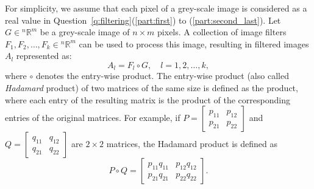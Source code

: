\documentclass[10pt,addpoints]{exam} %
\newcommand{\matrixTwo}[4]{\left[\begin{array}{cc}#1&#2\\#3&#4\end{array}\right]}
\newcommand{\nRm}{{}^{n}\mathbb{R}^{m}}
\newcommand{\makenonemptybox}[2]{%
\par\nobreak\vspace{\ht\strutbox}\noindent
\setlength{\fboxrule}{0pt} %
\fbox{%
\parbox[c][#1][t]{\dimexpr\linewidth-2\fboxsep}{
  \hrule width \hsize height 0pt
  \vspace{-0.6cm}
  \color{SolutionColor}#2\color{black}
 }%
}%
}
\begin{document}
\begin{questions}
  \question\label{q:filtering} For simplicity, we assume that each
    pixel of a grey-scale image is considered as a real value in
    Question~\ref{q:filtering}(\ref{part:first}) to (\ref{part:second_last}).
  Let $G \in \nRm$ be a grey-scale image of $n \times m$ pixels. A collection of
  image filters $ F_1, F_2, \dots, F_k \in \nRm$ can be used to process this
  image, resulting in filtered images $A_l$ represented as:
  \begin{equation}
    \label{eq:filter}
    A_l = F_l \circ G, \quad l = 1, 2, \dots, k,
  \end{equation}
  where $ \circ $ denotes the entry-wise product. The entry-wise product (also called
  \textit{Hadamard} product) of two matrices of the same size is defined as the product, where each
  entry of the resulting matrix is the product of the corresponding entries of the original
  matrices. For example, if $P = \matrixTwo{p_{11}}{p_{12}}{p_{21}}{p_{22}}$ and
  $Q= \matrixTwo{q_{11}}{q_{12}}{q_{21}}{q_{22}}$ are $2\times 2$ matrices, the Hadamard product is
  defined as
  \begin{equation}
  P\circ Q = \matrixTwo{p_{11}q_{11}}{p_{12}q_{12}}{p_{21}q_{21}}{p_{22}q_{22}}.
\end{equation}
        
\end{questions}
\end{document}
